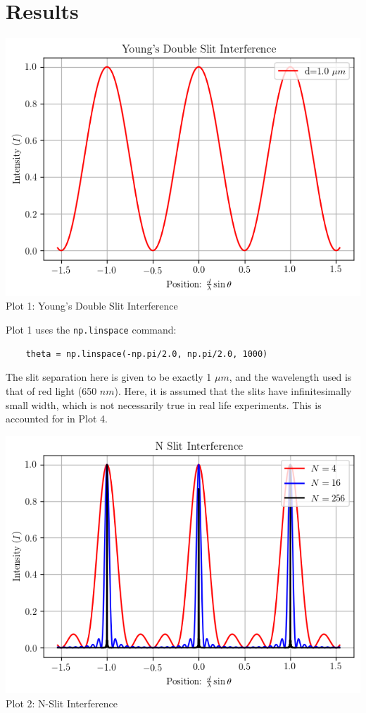 \documentclass[12pt]{article}
\begin{document}
\section{Results}
\begin{center}
\includegraphics*[]{yds.png}\\
Plot 1: Young's Double Slit Interference\\
\end{center}
Plot 1 uses the \verb+np.linspace+ command:
\begin{verbatim}
    theta = np.linspace(-np.pi/2.0, np.pi/2.0, 1000)
\end{verbatim}
The slit separation here is given to be exactly 1 $\mu m$, and the wavelength used is that of red light (650 $nm$).
Here, it is assumed that the slits have infinitesimally small width, which is not necessarily true in real life experiments. 
This is accounted for in Plot 4.
\begin{center}
    \includegraphics*[]{ns.png}\\
    Plot 2: N-Slit Interference\\
\end{center}
\end{document}
